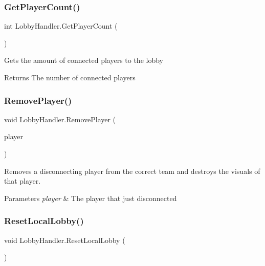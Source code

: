 \subsubsection{\texorpdfstring{Get\+Player\+Count()}{GetPlayerCount()}}
{\footnotesize\ttfamily int Lobby\+Handler.\+Get\+Player\+Count (\begin{DoxyParamCaption}{ }\end{DoxyParamCaption})}



Gets the amount of connected players to the lobby 

\begin{DoxyReturn}{Returns}
The number of connected players
\end{DoxyReturn}
\hypertarget{class_lobby_handler_a45ff185cbc0d3df476f940c29a601720}{}\label{class_lobby_handler_a45ff185cbc0d3df476f940c29a601720} 
\subsubsection{\texorpdfstring{Remove\+Player()}{RemovePlayer()}}
{\footnotesize\ttfamily void Lobby\+Handler.\+Remove\+Player (\begin{DoxyParamCaption}\item[{\hyperlink{class_d_l_network_lobby_player}{D\+L\+Network\+Lobby\+Player}}]{player }\end{DoxyParamCaption})}



Removes a disconnecting player from the correct team and destroys the visuals of that player. 


\begin{DoxyParams}{Parameters}
{\em player} & The player that just disconnected\\
\hline
\end{DoxyParams}
\hypertarget{class_lobby_handler_a76a6047c9ac78dd317f5d01ce8b6c465}{}\label{class_lobby_handler_a76a6047c9ac78dd317f5d01ce8b6c465} 
\subsubsection{\texorpdfstring{Reset\+Local\+Lobby()}{ResetLocalLobby()}}
{\footnotesize\ttfamily void Lobby\+Handler.\+Reset\+Local\+Lobby (\begin{DoxyParamCaption}{ }\end{DoxyParamCaption})}



